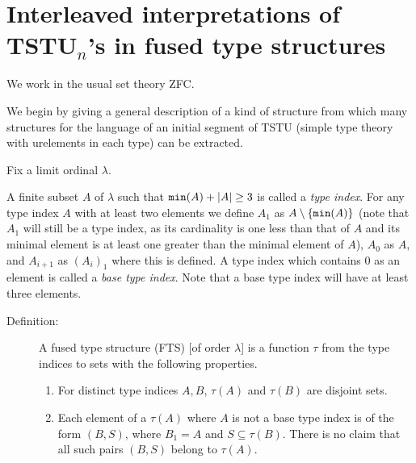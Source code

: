 \documentclass{article}
\begin{document}
\newpage

\section{Interleaved interpretations of TSTU$_n$'s in fused type structures}

We work in the usual set theory ZFC.

We begin by giving a general description of a kind of structure from which many structures for the language of an initial segment of TSTU (simple type theory with urelements
in each type) can be extracted.

Fix a limit ordinal $\lambda$.

A finite subset $A$ of $\lambda$ such that ${\tt min}(A)+|A| \geq 3$ is called a {\em type index\/}.  For any type index $A$ with at least two elements we define $A_1$ as $A \setminus \{{\tt min}(A)\}$ (note that $A_1$ will still be a type index, as its cardinality is one less than that of $A$ and its minimal element is at least one greater than the minimal element of $A$), $A_0$ as $A$,
and $A_{i+1}$ as $(A_i)_1$ where this is defined.   A type index which contains 0 as an element is called a {\em base type index}.  Note that a base type index will have at least three elements.

\begin{description}

\item[Definition:]   A fused type structure (FTS) [of order $\lambda$] is a function $\tau$ from the type indices to sets with the following properties.

\begin{enumerate}

\item  For distinct type indices $A, B$, $\tau(A)$ and $\tau(B)$ are disjoint sets. 

\item  Each element of a $\tau(A)$ where $A$ is not a base type index is of the form $(B,S)$, where $B_1=A$ and $S \subseteq \tau(B)$.  There is no claim that
all such pairs $(B,S)$ belong to $\tau(A)$.

\end{enumerate}

\end{description}
\end{document}
